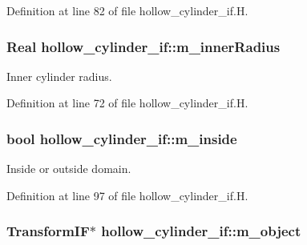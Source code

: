 Definition at line 82 of file hollow\+\_\+cylinder\+\_\+if.\+H.

\subsubsection[{\texorpdfstring{m\+\_\+inner\+Radius}{m_innerRadius}}]{\setlength{\rightskip}{0pt plus 5cm}Real hollow\+\_\+cylinder\+\_\+if\+::m\+\_\+inner\+Radius\hspace{0.3cm}{\ttfamily [protected]}}\hypertarget{classhollow__cylinder__if_ad9c34a10457a69839378556faedf6fe2}{}\label{classhollow__cylinder__if_ad9c34a10457a69839378556faedf6fe2}


Inner cylinder radius. 



Definition at line 72 of file hollow\+\_\+cylinder\+\_\+if.\+H.

\subsubsection[{\texorpdfstring{m\+\_\+inside}{m_inside}}]{\setlength{\rightskip}{0pt plus 5cm}bool hollow\+\_\+cylinder\+\_\+if\+::m\+\_\+inside\hspace{0.3cm}{\ttfamily [protected]}}\hypertarget{classhollow__cylinder__if_af9c34dac5f25bd52436bfbe7490a8e53}{}\label{classhollow__cylinder__if_af9c34dac5f25bd52436bfbe7490a8e53}


Inside or outside domain. 



Definition at line 97 of file hollow\+\_\+cylinder\+\_\+if.\+H.

\subsubsection[{\texorpdfstring{m\+\_\+object}{m_object}}]{\setlength{\rightskip}{0pt plus 5cm}Transform\+IF$\ast$ hollow\+\_\+cylinder\+\_\+if\+::m\+\_\+object\hspace{0.3cm}{\ttfamily [protected]}}\hypertarget{classhollow__cylinder__if_a96a4234945284cad647279fa30e8fb6c}{}\label{classhollow__cylinder__if_a96a4234945284cad647279fa30e8fb6c}


